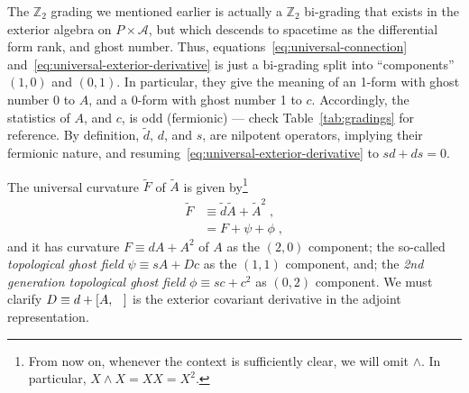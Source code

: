 \documentclass[../main.tex]{subfiles}
\begin{document}
The $\mathbb{Z}_2$ grading we mentioned earlier is actually a $\mathbb{Z}_2$ bi-grading that exists in the exterior algebra on $P \times \mathcal{A}$, but which descends to spacetime as the differential form rank, and ghost number. Thus, equations~\eqref{eq:universal-connection} and~\eqref{eq:universal-exterior-derivative} is just a bi-grading split into \mkbibquote{components} $(1,0)$ and $(0,1)$. In particular, they give the meaning of an 1-form with ghost number 0 to $A$, and a 0-form with ghost number 1 to $c$. Accordingly, the statistics of $A$, and $c$, is odd (fermionic) --- check Table~\ref{tab:gradings} for reference. By definition, $\tilde{d}$, $d$, and $s$, are nilpotent operators, implying their fermionic nature, and resuming~\eqref{eq:universal-exterior-derivative} to $sd + ds = 0$.

The universal curvature $ \tilde{F} $ of $\tilde{A}$ is given by\footnote{From now on, whenever the context is sufficiently clear, we will omit $\wedge$. In particular, $X \wedge X = XX = X^2$.}
\begin{subequations}%
  \label{eq:universal-curvature}
  \begin{align}
    \tilde{F} & \equiv \tilde{d}\tilde{A}+\tilde{A}^2 \;, \\
              & = F+\psi+\phi \;,
  \end{align}
\end{subequations}
and it has curvature $F\equiv dA+A^2$ of $A$ as the $(2,0)$  component; the so-called \emph{topological ghost field} $\psi \equiv sA + Dc$ as the $(1,1)$ component, and; the \emph{2nd generation topological ghost field} $\phi \equiv sc + c^2$ as $(0,2)$ component. We must clarify $D \equiv d+ \left[A, \hphantom{A}\right] $ is the exterior covariant derivative in the adjoint representation.
\end{document}
